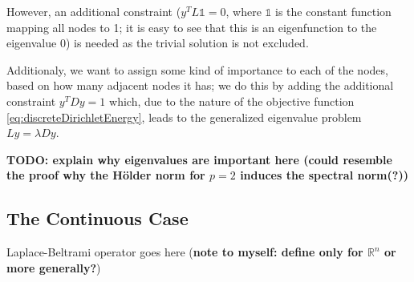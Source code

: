 However, an additional constraint ($y^TL\mathbb{1}=0$, where $\mathbb{1}$ is the constant function mapping all nodes to 1; it is easy to see that this is an eigenfunction to the eigenvalue 0) is needed as the trivial solution is not excluded.

Additionaly, we want to assign some kind of importance to each of the nodes, based on how many adjacent nodes it has; we do this by adding the additional constraint $y^TDy=1$ which, due to the nature of the objective function \eqref{eq:discreteDirichletEnergy}, leads to the generalized eigenvalue problem $Ly=\lambda Dy$.

\textbf{TODO: explain why eigenvalues are important here (could resemble the proof why the Hölder norm for $p=2$ induces the spectral norm(?))}

\subsection{The Continuous Case}
\begin{definition}
    Laplace-Beltrami operator goes here (\textbf{note to myself: define only for $\mathbb{R}^n$ or more generally?})
\end{definition}